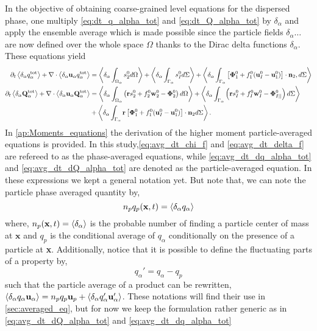 In the objective of obtaining coarse-grained level equations for the dispersed phase, one multiply \ref{eq:dt_q_alpha_tot} and \ref{eq:dt_Q_alpha_tot} by $\delta_\alpha$ and apply the ensemble average which is made possible since the particle fields $\delta_\alpha \ldots$ are now defined over the whole space $\Omega$ thanks to the Dirac delta functions $\delta_\alpha$.  
These equations yield
\begin{align}
    \partial_t \left<\delta_\alpha  q_\alpha^\text{tot}\right>
    + \mathbf{\nabla}\cdot \left<\delta_\alpha\textbf{u}_\alpha q_\alpha^\text{tot}\right>
    &= \left<\delta_\alpha \int_{\Omega_\alpha}  s_2^0  d\Omega\right>
    + \left<\delta_\alpha \int_{\Gamma_\alpha}  s_I^0  d\Sigma\right>
    + \left<\delta_\alpha \int_{\Gamma_\alpha}  \left[\mathbf{\Phi}_1^0 + f_1^0 (\textbf{u}_I^0-\textbf{u}_1^0) \right] \cdot \textbf{n}_2 , d\Sigma\right>
    \label{eq:avg_dt_dq_alpha_tot}\\
    \partial_t \left<\delta_\alpha \textbf{Q}_\alpha^\text{tot}\right>
    + \mathbf{\nabla}\cdot \left<\delta_\alpha\textbf{u}_\alpha\textbf{Q}_\alpha^\text{tot}\right>
    &=\left<\delta_\alpha \int_{\Omega_\alpha}  \left(
        \textbf{r} s_2^0         
        + f_2^0  \textbf{w}_2^0 
        - \mathbf{\Phi}_2^0
    \right)  d\Omega\right>
    + \left<\delta_\alpha \int_{\Gamma_\alpha}  \left(
        \textbf{r}s_I^0
        + f_I^0 \textbf{w}_I^0
        - \mathbf{\Phi}_{I||}^0
    \right)  d\Sigma\right>\nonumber\\
    &+ \left<\delta_\alpha \int_{\Gamma_\alpha}  \textbf{r} \left[
        \mathbf{\Phi}_1^0
        + f_1^0 (\textbf{u}_I^0-\textbf{u}_1^0)
    \right]\cdot \textbf{n}_2   d\Sigma\right>.
    \label{eq:avg_dt_dQ_alpha_tot}
\end{align}
In \ref{ap:Moments_equations} the derivation of the higher moment particle-averaged equations is provided. 
In this study,\ref{eq:avg_dt_chi_f} and \ref{eq:avg_dt_delta_f} are refereed to as the phase-averaged equations, while \ref{eq:avg_dt_dq_alpha_tot} and \ref{eq:avg_dt_dQ_alpha_tot} are denoted as the particle-averaged equation. 
In these expressions we kept a general notation yet. 
But note that, we can note the particle phase averaged quantity by,
\begin{equation}
     n_p q_p(\textbf{x},t) = \left<\delta_\alpha q_\alpha\right>
     \label{eq:p_avg}
\end{equation}
where, $n_p(\textbf{x},t) = \left<\delta_\alpha\right>$ is the probable number of finding a particle center of mass at $\textbf{x}$
and $q_p$ is the conditional average of $q_\alpha$ conditionally on the presence of a particle at \textbf{x}. 
Additionally, notice that it is possible to define the fluctuating parts of a property by, 
\begin{equation}
    q_\alpha' = q_\alpha - q_p
\end{equation}
such that the particle average of a product can be rewritten, $\left<\delta_\alpha q_\alpha\textbf{u}_\alpha\right> = n_p q_p \textbf{u}_p + \left<\delta_\alpha q_\alpha' \textbf{u}_\alpha'\right>$. 
These notations will find their use in \ref{sec:averaged_eq}, but for now we keep the formulation rather generic as in \ref{eq:avg_dt_dQ_alpha_tot} and \ref{eq:avg_dt_dq_alpha_tot}

 



